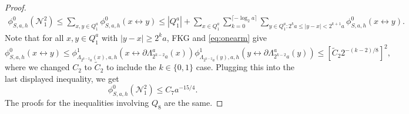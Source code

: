 \documentclass[10pt,a4paper]{amsart}
\begin{document}
\begin{proof}
\begin{align*}\phi_{S,a,h}^0(\mathcal{N}_1^2)\leq \sum_{x,y\in Q_1^a} \phi_{S,a,h}^0(x\longleftrightarrow y)\leq |Q_1^a|+\sum_{x\in Q_1^a}\sum_{k=0}^{\lceil -\log_2 a \rceil}\sum_{y\in Q_1^a: 2^{k}a\leq |y-x|<2^{k+1}a} \phi_{S,a,h}^0(x\longleftrightarrow y).
	\end{align*}
	Note that for all $x,y\in Q_1^a$ with $|y-x|\geq 2^{k}a$, FKG and \eqref{eq:onearm} give
	\[\phi_{S,a,h}^0(x\longleftrightarrow y)\leq \phi_{\Lambda_{2^{k-2}a}(x),a,h}^1(x\longleftrightarrow \partial \Lambda_{2^{k-2}a}^a(x))\phi_{\Lambda_{2^{k-2}a}(y),a,h}^1(y\longleftrightarrow \partial \Lambda_{2^{k-2}a}^a(y))\leq[\tilde{C}_2 2^{-(k-2)/8}]^2,\]
	  where we changed $C_2$ to $\tilde{C}_2$ to include the $k\in\{0,1\}$ case. Plugging this into the last displayed inequality, we get
	\[\phi_{S,a,h}^0(\mathcal{N}_1^2)\leq C_7a^{-15/4}.\]
The proofs for the inequalities involving $Q_8$ are the same.	 
\end{proof}
\end{document}
